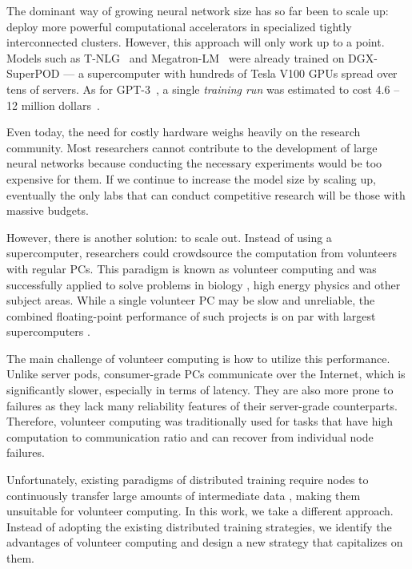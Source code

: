 The dominant way of growing neural network size has so far been to scale up: deploy more powerful computational accelerators in specialized tightly interconnected clusters. However, this approach will only work up to a point. Models such as T-NLG~\cite{tnlg} and Megatron-LM~\cite{shoeybi2019megatron} were already trained on DGX-SuperPOD --- a supercomputer with hundreds of Tesla V100 GPUs spread over tens of servers. As for GPT-3~\cite{brown2020language}, a single \textit{training run} was estimated to cost 4.6 -- 12 million dollars~\cite{gpt3costlambda,gpt3cost}. 

Even today, the need for costly hardware weighs heavily on the research community. Most researchers cannot contribute to the development of large neural networks because conducting the necessary experiments would be too expensive for them. If we continue to increase the model size by scaling up, eventually the only labs that can conduct competitive research will be those with massive budgets.

However, there is another solution: to scale out. Instead of using a supercomputer, researchers could crowdsource the computation from volunteers with regular PCs. %
This paradigm is known as volunteer computing and was successfully applied to solve problems in biology \cite{larson_crowd}, high energy physics \cite{adam2015atlas} and other subject areas. While a single volunteer PC may be slow and unreliable, the combined floating-point performance of such projects is on par with largest supercomputers \cite{gross_folding}.

The main challenge of volunteer computing is how to utilize this performance. Unlike server pods, consumer-grade PCs communicate over the Internet, which is significantly slower, especially in terms of latency. They are also more prone to failures as they lack many reliability features of their server-grade counterparts. Therefore, volunteer computing was traditionally used for tasks that have high computation to communication ratio and can recover from individual node failures.

Unfortunately, existing paradigms of distributed training require nodes to continuously transfer large amounts of intermediate data \cite{Dettmers20158BitAF,Sun2019OptimizingNP}, making them unsuitable for volunteer computing. In this work, we take a different approach. Instead of adopting the existing distributed training strategies, we identify the advantages of volunteer computing and design a new strategy that capitalizes on them.


